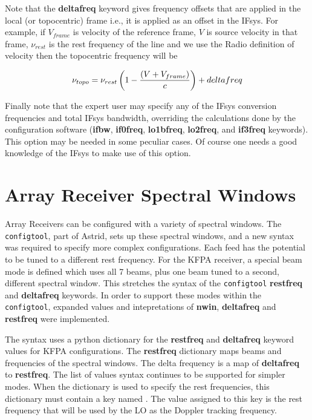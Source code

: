 Note that the {\bf deltafreq} keyword gives frequency offsets that are applied in 
the local (or topocentric) frame i.e., it is applied as an offset in the \gls{IFsys}.
For example, if $V_{frame}$ is velocity of the reference frame, $V$ is source velocity
in that frame, $\nu_{rest}$ is the rest frequency of the line and we use the Radio
definition of velocity then the topocentric frequency will be

\begin{equation}
\nu_{topo} = \nu_{rest} \left( 1 - {\left(V+V_{frame}\right) \over c} \right) 
+ deltafreq
\end{equation}

Finally note that the expert user may specify any of the \gls{IFsys} conversion 
frequencies and total \gls{IFsys} bandwidth, overriding the calculations done by the 
configuration software ({\bf ifbw}, {\bf if0freq}, {\bf lo1bfreq}, {\bf lo2freq}, and
{\bf if3freq} keywords). This option may be needed in some peculiar cases. Of course
one needs a good knowledge of the \gls{IFsys} to make use of this option. 

\section{Array Receiver Spectral Windows}

Array Receivers can be configured with a variety of spectral windows. The
{\tt configtool}, part of \gls{Astrid}, sets up these spectral windows, and a new
syntax was required to specify more complex configurations.  Each feed has the
potential to be tuned to a different rest frequency. For the \gls{KFPA} receiver,
a special  beam mode is defined which uses all 7 beams, plus one beam tuned
to a second, different spectral window. This stretches the syntax of the
{\tt configtool} {\bf restfreq} and {\bf deltafreq} keywords. In order to support
these modes within the {\tt configtool}, expanded values and intepretations of
{\bf nwin}, {\bf deltafreq} and {\bf restfreq} were implemented.

The syntax uses a python dictionary for the {\bf restfreq} and {\bf deltafreq}
keyword values for \gls{KFPA} configurations. The {\bf restfreq} dictionary maps
beams and frequencies of the spectral windows. The delta frequency is a map of
{\bf deltafreq} to {\bf restfreq}. The list of values syntax continues to be
supported for simpler modes. When the dictionary is used to specify the rest
frequencies, this dictionary must contain a key named . 
The value assigned to this key is the rest frequency that will be used by
the \gls{LO} as the Doppler tracking frequency.

